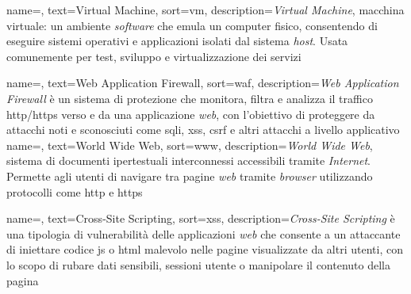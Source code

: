  {
    name=,
    text=Virtual Machine,
    sort=vm,
    description={\emph{Virtual Machine}, macchina virtuale: un ambiente \emph{software} che emula un computer fisico, consentendo di eseguire sistemi operativi e applicazioni isolati dal sistema \emph{host}. Usata comunemente per test, sviluppo e virtualizzazione dei servizi}
}

 {
    name=,
    text=Web Application Firewall,
    sort=waf,
    description={\emph{Web Application Firewall} è un sistema di protezione che monitora, filtra e analizza il traffico \gls{http}/\gls{https} verso e da una applicazione \emph{web}, con l'obiettivo di proteggere da attacchi noti e sconosciuti come \gls{sqli}, \gls{xss}, \gls{csrf} e altri attacchi a livello applicativo}
}
 {
    name=,
    text=World Wide Web,
    sort=www,
    description={\emph{World Wide Web}, sistema di documenti ipertestuali interconnessi accessibili tramite \emph{Internet}. Permette agli utenti di navigare tra pagine \emph{web} tramite \emph{browser} utilizzando protocolli come \gls{http} e \gls{https}}
}

 {
    name=,
    text=Cross-Site Scripting,
    sort=xss,
    description={\emph{Cross-Site Scripting} è una tipologia di vulnerabilità delle applicazioni \emph{web} che consente a un attaccante di iniettare codice \gls{js} o \gls{html} malevolo nelle pagine visualizzate da altri utenti, con lo scopo di rubare dati sensibili, sessioni utente o manipolare il contenuto della pagina}
}


